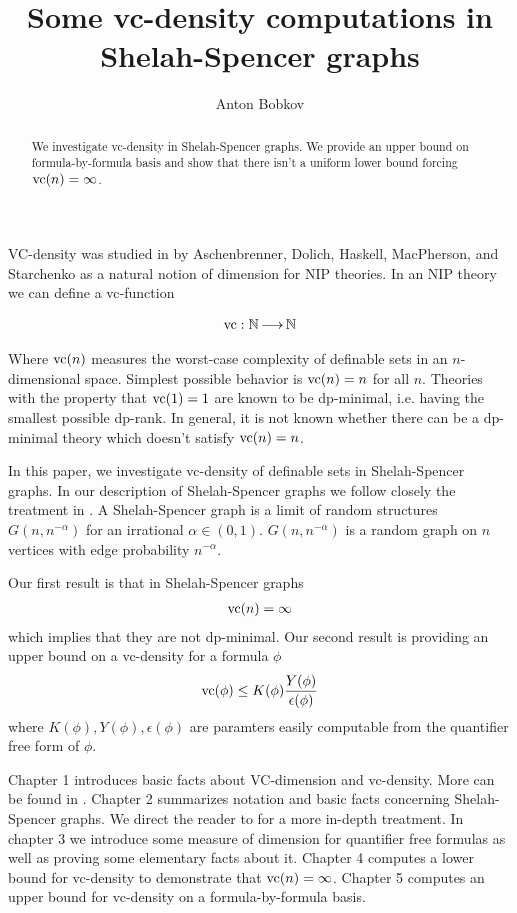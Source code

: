 \documentclass{amsart}
\title{Some vc-density computations in Shelah-Spencer graphs}
\author{Anton Bobkov}
\begin{document}
\begin{abstract}
  We investigate vc-density in Shelah-Spencer graphs.
  We provide an upper bound on formula-by-formula basis and show that there isn't a uniform lower bound forcing $\operatorname{vc}(n) = \infty$.
\end{abstract}

\maketitle


VC-density was studied in \cite{vc_density} by Aschenbrenner, Dolich, Haskell, MacPherson, and Starchenko as a natural notion of dimension for NIP theories. In an NIP theory we can define a vc-function

\begin{align*}
	\operatorname{vc} : \mathbb{N} \operatorname{\longrightarrow} \mathbb{N}
\end{align*}

Where $\operatorname{vc}(n)$ measures the worst-case complexity of definable sets in an $n$-dimensional space. Simplest possible behavior is $\operatorname{vc}(n) = n$ for all $n$. Theories with the property that $\operatorname{vc}(1) = 1$ are known to be dp-minimal, i.e. having the smallest possible dp-rank. In general, it is not known whether there can be a dp-minimal theory which doesn't satisfy $\operatorname{vc}(n)=n$.

In this paper, we investigate vc-density of definable sets in Shelah-Spencer graphs.
In our description of Shelah-Spencer graphs we follow closely the treatment in \cite{laskowski}.
A Shelah-Spencer graph is a limit of random structures $G(n, n^{-\alpha})$ for an irrational $\alpha \in (0,1)$.
$G(n, n^{-\alpha})$ is a random graph on $n$ vertices with edge probability $n^{-\alpha}$.

Our first result is that in Shelah-Spencer graphs
\begin{align*}
    \operatorname{vc}(n) = \infty
\end{align*}
which implies that they are not dp-minimal.
Our second result is providing an upper bound on a vc-density for a formula $\phi$
\begin{align*}
    \operatorname{vc}(\phi) \leq K(\phi) \frac{Y(\phi)}{\epsilon(\phi)}    
\end{align*}
where $K(\phi), Y(\phi), \epsilon(\phi)$ are paramters easily computable from the quantifier free form of $\phi$.

Chapter 1 introduces basic facts about VC-dimension and vc-density.
More can be found in \cite{vc_density}.
Chapter 2 summarizes notation and basic facts concerning Shelah-Spencer graphs.
We direct the reader to \cite{laskowski} for a more in-depth treatment.
In chapter 3 we introduce some measure of dimension for quantifier free formulas as well as proving some elementary facts about it.
Chapter 4 computes a lower bound for vc-density to demonstrate that $\operatorname{vc}(n) = \infty$.
Chapter 5 computes an upper bound for vc-density on a formula-by-formula basis.
\end{document}
